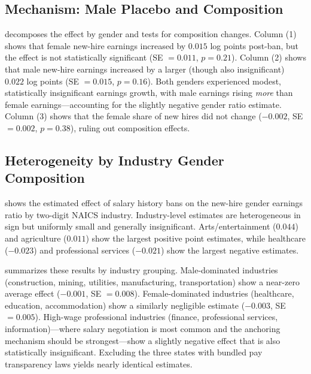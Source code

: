 \documentclass[12pt]{article}
\begin{document}


\subsection{Mechanism: Male Placebo and Composition}

 decomposes the effect by gender and tests for composition changes. Column (1) shows that female new-hire earnings increased by $0.015$ log points post-ban, but the effect is not statistically significant (SE $= 0.011$, $p = 0.21$). Column (2) shows that male new-hire earnings increased by a larger (though also insignificant) $0.022$ log points (SE $= 0.015$, $p = 0.16$). Both genders experienced modest, statistically insignificant earnings growth, with male earnings rising \textit{more} than female earnings---accounting for the slightly negative gender ratio estimate. Column (3) shows that the female share of new hires did not change ($-0.002$, SE $= 0.002$, $p = 0.38$), ruling out composition effects.



\subsection{Heterogeneity by Industry Gender Composition}

 shows the estimated effect of salary history bans on the new-hire gender earnings ratio by two-digit NAICS industry. Industry-level estimates are heterogeneous in sign but uniformly small and generally insignificant. Arts/entertainment ($0.044$) and agriculture ($0.011$) show the largest positive point estimates, while healthcare ($-0.023$) and professional services ($-0.021$) show the largest negative estimates.

 summarizes these results by industry grouping. Male-dominated industries (construction, mining, utilities, manufacturing, transportation) show a near-zero average effect ($-0.001$, SE $= 0.008$). Female-dominated industries (healthcare, education, accommodation) show a similarly negligible estimate ($-0.003$, SE $= 0.005$). High-wage professional industries (finance, professional services, information)---where salary negotiation is most common and the anchoring mechanism should be strongest---show a slightly negative effect that is also statistically insignificant. Excluding the three states with bundled pay transparency laws yields nearly identical estimates.
\end{document}
